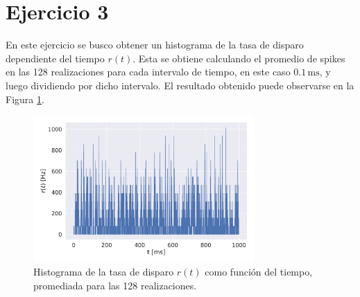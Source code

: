 \section*{Ejercicio 3}
\graphicspath{{Figuras/}}

En este ejercicio se busco obtener un histograma de la tasa de disparo dependiente del tiempo $r(t)$. Esta se obtiene calculando el promedio de spikes en las 128 realizaciones para cada intervalo de tiempo, en este caso $0.1\,\text{ms}$, y luego dividiendo por dicho intervalo. El resultado obtenido puede observarse en la Figura \ref{03:fig:rt}. 

\begin{figure}[h!]
    \centering
    \includegraphics[width=0.75\textwidth]{3_rt.pdf}
    \caption{Histograma de la tasa de disparo $r(t)$ como función del tiempo, promediada para las 128 realizaciones.}
    \label{03:fig:rt}
\end{figure}